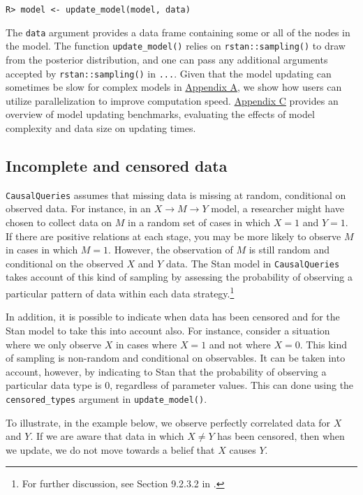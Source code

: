\documentclass[
  11pt,
  article]{jss}
\begin{document}
\begin{verbatim}
R> model <- update_model(model, data)
\end{verbatim}

The \texttt{data} argument provides a data frame containing some or all
of the nodes in the model. The function \texttt{update\_model()} relies
on \texttt{rstan::sampling()} to draw from the posterior distribution,
and one can pass any additional arguments accepted by
\texttt{rstan::sampling()} in \texttt{...}. Given that the model
updating can sometimes be slow for complex models in
\hyperref[sec-parallel]{Appendix A}, we show how users can utilize
parallelization to improve computation speed.
\hyperref[sec-benchmark]{Appendix C} provides an overview of model
updating benchmarks, evaluating the effects of model complexity and data
size on updating times.

\subsection{Incomplete and censored
data}\label{incomplete-and-censored-data}

\texttt{CausalQueries} assumes that missing data is missing at random,
conditional on observed data. For instance, in an
\(X \rightarrow M \rightarrow Y\) model, a researcher might have chosen
to collect data on \(M\) in a random set of cases in which \(X=1\) and
\(Y=1\). If there are positive relations at each stage, you may be more
likely to observe \(M\) in cases in which \(M=1\). However, the
observation of \(M\) is still random and conditional on the observed
\(X\) and \(Y\) data. The Stan model in \texttt{CausalQueries} takes
account of this kind of sampling by assessing the probability of
observing a particular pattern of data within each data
strategy.\footnote{For further discussion, see Section 9.2.3.2 in
  \citet{humphreys_integrated_2023}.}

In addition, it is possible to indicate when data has been censored and
for the Stan model to take this into account also. For instance,
consider a situation where we only observe \(X\) in cases where \(X=1\)
and not where \(X=0\). This kind of sampling is non-random and
conditional on observables. It can be taken into account, however, by
indicating to Stan that the probability of observing a particular data
type is \(0\), regardless of parameter values. This can done using the
\texttt{censored\_types} argument in \texttt{update\_model()}.

To illustrate, in the example below, we observe perfectly correlated
data for \(X\) and \(Y\). If we are aware that data in which
\(X \neq Y\) has been censored, then when we update, we do not move
towards a belief that \(X\) causes \(Y\).
\end{document}
